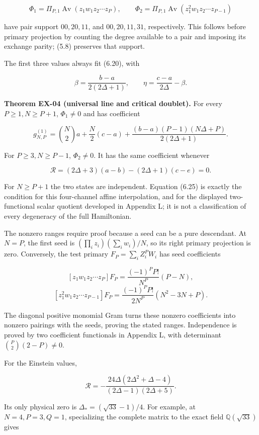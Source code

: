 \documentclass[a4paper,11pt]{article}
\numberwithin{equation}{section}
\begin{document}
\[
\Phi_1=\Pi_{P,1}\operatorname{Av}(z_1w_1z_2\cdots z_P),
\qquad
\Phi_2=\Pi_{P,1}\operatorname{Av}(z_1^2w_1z_2\cdots z_{P-1})
\tag{6.22}
\]

have pair support \(00,20,11\), and \(00,20,11,31\), respectively. This follows before primary projection by counting the degree available to a pair and imposing its exchange parity; (5.8) preserves that support.

The first three values always fit (6.20), with

\[
\beta=\frac{b-a}{2(2\Delta+1)},\qquad
\eta=\frac{c-a}{2\Delta}-\beta.
\tag{6.23}
\]

\textbf{Theorem EX-04 (universal line and critical doublet).} For every \(P\ge1,N\ge P+1\), \(\Phi_1\ne0\) and has coefficient

\[
g_{N,P}^{(1)}=\binom N2a+\frac N2(c-a)
+\frac{(b-a)(P-1)(N\Delta+P)}{2(2\Delta+1)}.
\tag{6.24}
\]

For \(P\ge3,N\ge P-1\), \(\Phi_2\ne0\). It has the same coefficient whenever

\[
\mathcal R=(2\Delta+3)(a-b)-(2\Delta+1)(c-e)=0.
\tag{6.25}
\]

For \(N\ge P+1\) the two states are independent. Equation (6.25) is exactly the condition for this four-channel affine interpolation, and for the displayed two-functional scalar quotient developed in Appendix L; it is not a classification of every degeneracy of the full Hamiltonian.

The nonzero ranges require proof because a seed can be a pure descendant. At \(N=P\), the first seed is \((\prod_i z_i)(\sum_iw_i)/N\), so its right primary projection is zero. Conversely, the test primary \(F_P=\sum_iZ_i^PW_i\) has seed coefficients

\[
[z_1w_1z_2\cdots z_P]F_P=
\frac{(-1)^PP!}{N^P}(P-N),
\] \[
[z_1^2w_1z_2\cdots z_{P-1}]F_P=
\frac{(-1)^PP!}{2N^P}(N^2-3N+P).
\tag{6.26}
\]

The diagonal positive monomial Gram turns these nonzero coefficients into nonzero pairings with the seeds, proving the stated ranges. Independence is proved by two coefficient functionals in Appendix L, with determinant \(\binom P2(2-P)\ne0\).

For the Einstein values,

\[
\mathcal R=-\frac{24\Delta(2\Delta^2+\Delta-4)}{(2\Delta-1)(2\Delta+5)}.
\tag{6.27}
\]

Its only physical zero is \(\Delta_*=(\sqrt{33}-1)/4\). For example, at \(N=4,P=3,Q=1\), specializing the complete matrix to the exact field \(\mathbb Q(\sqrt{33})\) gives
\end{document}
